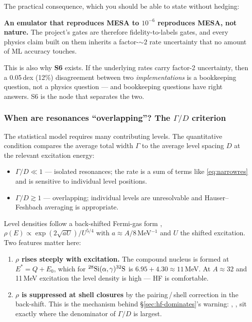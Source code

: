 The practical consequence, which you should be able to state without hedging:

\begin{warn}
\textbf{An emulator that reproduces MESA to $10^{-6}$ reproduces MESA, not
nature.} The project's gates are therefore fidelity-to-labels gates, and every
physics claim built on them inherits a factor-${\sim}2$ rate uncertainty that no
amount of ML accuracy touches.
\end{warn}

This is also why \textbf{S6} exists. If the underlying rates carry factor-2
uncertainty, then a 0.05\,dex (12\%) disagreement between two
\emph{implementations} is a bookkeeping question, not a physics question --- and
bookkeeping questions have right answers. S6 is the node that separates the two.

\subsubsection{When are resonances ``overlapping''? The \texorpdfstring{$\Gamma/D$}{Gamma/D} criterion}
\label{sec:gammaD}

The statistical model requires many contributing levels. The quantitative
condition compares the average total width $\Gamma$ to the average level
spacing $D$ at the relevant excitation energy:

\begin{itemize}
\item \textbf{$\Gamma/D \ll 1$} --- isolated resonances; the rate is a sum of
      terms like \eqref{eq:narrowres} and is sensitive to individual level
      positions.
\item \textbf{$\Gamma/D \gtrsim 1$} --- overlapping; individual levels are
      unresolvable and Hauser--Feshbach averaging is appropriate.
\end{itemize}

Level densities follow a back-shifted Fermi-gas form \citep{rauscher1997},
$\rho(E) \propto \exp(2\sqrt{aU})/U^{5/4}$ with $a \approx A/8$\,MeV$^{-1}$ and
$U$ the shifted excitation. Two features matter here:

\begin{enumerate}
\item \textbf{$\rho$ rises steeply with excitation.} The compound nucleus is
      formed at $E^* = Q + E_0$, which for
      $\nuc{Si}{28}(\alpha,\gamma)\nuc{S}{32}$ is $6.95 + 4.30 \approx 11$\,MeV.
      At $A \approx 32$ and 11\,MeV excitation the level density is high --- HF
      is comfortable.
\item \textbf{$\rho$ is suppressed at shell closures} by the pairing\,/\,shell
      correction in the back-shift. This is the mechanism behind
      \S\ref{sec:hf-dominates}'s warning: , ,
       sit exactly where the denominator of $\Gamma/D$ is largest.
\end{enumerate}

